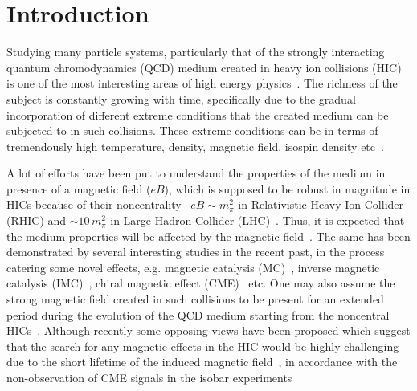 \documentclass[aps,prd,floatfix,showpacs,showkeys,superscriptadress,unsortedaddress,nofootinbib,onecolumn]{revtex4-1}
\begin{document}
\section{Introduction}
\label{sec:intro}
Studying many particle systems, particularly that of the strongly interacting quantum chromodynamics (QCD) medium created in heavy ion collisions (HIC) is one of the most interesting areas of high energy physics~\cite{Muller:1983ed,Heinz:2000bk,Pasechnik:2016wkt}. The richness of the subject is constantly growing with time, specifically due to the gradual incorporation of different extreme conditions that the created medium can be subjected to in such collisions. These extreme conditions can be in terms of tremendously high temperature, density, magnetic field, isospin density etc~\cite{Fukushima:2011jc,Yagi:2005yb}.

A lot of efforts have been put to understand the properties of the medium in presence of a magnetic field ($eB$), which is supposed to be robust in magnitude in HICs because of their noncentrality \textemdash\, $eB\sim m_\pi^2$ in Relativistic Heavy Ion Collider (RHIC) and $\sim10\,m_\pi^2$ in Large Hadron Collider (LHC)~\cite{Skokov:2009qp}. Thus, it is expected that the medium properties will be affected by the magnetic field~\cite{Kharzeev:2013jha,Miransky:2015ava}. The same has been demonstrated by several interesting studies in the recent past, in the process catering some novel effects, e.g. magnetic catalysis (MC)~\cite{Gusynin:1994re}, inverse magnetic catalysis (IMC)~\cite{Bali:2012zg,Bali:2011qj}, chiral magnetic effect (CME)~\cite{Fukushima:2008xe} etc. One may also assume the strong magnetic field created in such collisions to be present for an extended period during the evolution of the QCD medium starting from the noncentral HICs~\cite{Tuchin:2015oka, Skokov:2009qp,Guo:2019mgh}. Although recently some opposing views have been proposed which suggest that the search for any magnetic effects in the HIC would be highly challenging due to the short lifetime of the induced magnetic field~\cite{Wang:2021oqq}, in accordance with the non-observation of CME signals in the isobar experiments~\cite{STAR:2021mii}
\end{document}
